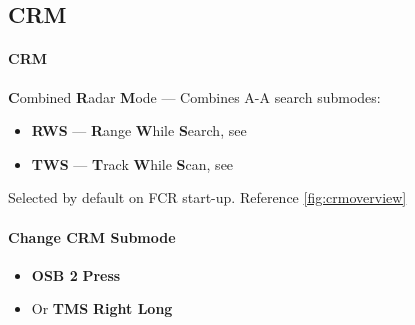 \subsection{CRM}
\label{subsec:crm}

\paragraph{CRM}
\textbf{C}ombined \textbf{R}adar \textbf{M}ode --- Combines A-A search submodes:

\begin{itemize}
    \item \textbf{RWS} --- \textbf{R}ange \textbf{W}hile \textbf{S}earch,
    see 
    \item \textbf{TWS} --- \textbf{T}rack \textbf{W}hile \textbf{S}can,
    see 
\end{itemize}

Selected by default on FCR start-up. Reference \cref{fig:crmoverview}

\paragraph{Change CRM Submode}
\begin{itemize}
    \item \textbf{OSB 2} \dotfill \textbf{Press}
    \item Or \textbf{TMS} \dotfill \textbf{Right Long}
\end{itemize}

